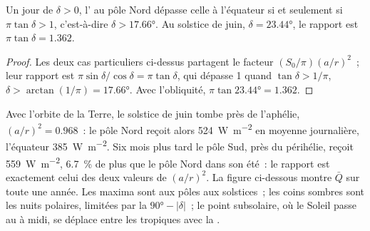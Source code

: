 \begin{proposition}\label{prop:b1:radiation-heat-transport:polar-summer}
Un jour de  $\delta > 0$, l' au pôle Nord
dépasse celle à l'équateur si et seulement si $\pi\tan\delta > 1$, c'est-à-dire $\delta >
\ang{17.66}$. Au solstice de juin, $\delta = \ang{23.44}$, le rapport est $\pi\tan
\delta = 1.362$.
\end{proposition}

\begin{proof}
Les deux cas particuliers ci-dessus partagent le facteur $(S_0/\pi)(a/r)^2$~; leur rapport est
$\pi\sin\delta/\cos\delta = \pi\tan\delta$, qui dépasse 1 quand $\tan\delta >
1/\pi$, $\delta > \arctan(1/\pi) = \ang{17.66}$. Avec l'obliquité,
$\pi\tan\ang{23.44} = 1.362$.
\end{proof}

Avec l'orbite de la Terre, le solstice de juin tombe près de l'aphélie, $(a/r)^2 = 0.968$~:
le pôle Nord reçoit alors \qty{524}{W.m^{-2}} en moyenne journalière, l'équateur
\qty{385}{W.m^{-2}}. Six mois plus tard le pôle Sud, près du périhélie, reçoit
\qty{559}{W.m^{-2}}, \qty{6.7}{\percent} de plus que le pôle Nord dans son
été~: le rapport est exactement celui des deux valeurs de $(a/r)^2$. La figure ci-dessous
montre $\bar Q$ sur toute une année. Les maxima sont aux pôles aux solstices~;
les coins sombres sont les nuits polaires, limitées par la  $\ang{90} -
|\delta|$~; le point subsolaire, où le Soleil passe au  à midi, se déplace
entre les tropiques avec la .

